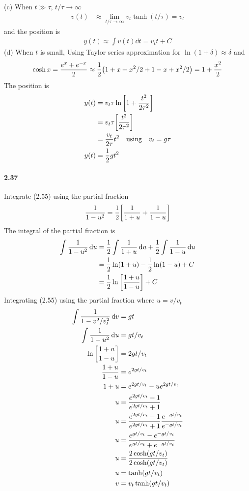 \documentclass[../problems.tex]{subfiles}
\begin{document}
(c) When $t\gg\tau$, $t/\tau \rightarrow \infty$
\begin{align*}
    v(t) &\approx \lim_{t/\tau \rightarrow \infty}v_t \tanh(t/\tau) = v_t
\end{align*}
and the position is
\begin{align*}
    y(t) \approx \int v(t) \dd{t} = v_t t + C
\end{align*}
(d) When $t$ is small, Using Taylor series approximation for $\ln(1+\delta)\approx\delta$ and 
\begin{align*}
    \cosh x = \frac{e^x + e^{-x}}{2} \approx \frac{1}{2} \quantity(1 + x + x^2/2 + 1 - x + x^2/2)
        = 1 + \frac{x^2}{2} \\ 
\end{align*}
The position is
\begin{align*}
    y(t) &= v_t \tau \ln\quantity[1+\frac{t^2}{2\tau^2}] \\
    &= v_t \tau \quantity[\frac{t^2}{2\tau^2}] \\
    &= \frac{v_t}{2\tau} t^2 \qusing{v_t = g\tau} \\
    y(t) &= \frac{1}{2} gt^2
\end{align*}

\paragraph{2.37} Integrate (2.55) using the partial fraction
\begin{align*}
    \frac{1}{1-u^2} = \frac{1}{2}\quantity[\frac{1}{1+u} + \frac{1}{1-u}]
\end{align*}
\barh 
The integral of the partial fraction is
\begin{align*}
    \int \frac{1}{1-u^2} \dd{u} &= \frac{1}{2} \int \frac{1}{1+u} \dd{u} + \frac{1}{2} \int 
        \frac{1}{1-u} \dd{u} \\
    &= \frac{1}{2} \ln(1+u) - \frac{1}{2} \ln(1-u) + C \\
    &= \frac{1}{2} \ln\quantity[\frac{1+u}{1-u}] + C
\end{align*}
Integrating (2.55) using the partial fraction where $u = v/v_t$
\begin{align*}
    \int \frac{1}{1-v^2/v_t^2} \dd{v} &= gt \\
    \int \frac{1}{1-u^2} \dd{u} &= gt/v_t \\
    \ln\quantity[\frac{1+u}{1-u}] &= 2gt/v_t \\
    \frac{1+u}{1-u} &= e^{2gt/v_t} \\
    1+u &= e^{2gt/v_t} - ue^{2gt/v_t} \\
    u &= \frac{e^{2gt/v_t} - 1}{e^{2gt/v_t} + 1} \\
    u &= \frac{e^{2gt/v_t} - 1}{e^{2gt/v_t} + 1} \frac{e^{-gt/v_t}}{e^{-gt/v_t}} \\
    u &= \frac{e^{gt/v_t} - e^{-gt/v_t}}{e^{gt/v_t} + e^{-gt/v_t}} \\
    u &= \frac{2\cosh(gt/v_t)}{2\cosh(gt/v_t)} \\
    u &= \tanh(gt/v_t) \\
    v &= v_t \tanh(gt/v_t)
\end{align*}
\end{document}
